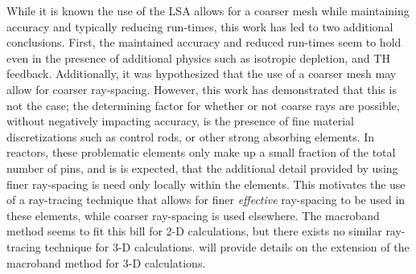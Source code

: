 {{    While it is known the use of the \ac{LSA} allows for a coarser mesh while maintaining accuracy and typically reducing run-times, this work has led to two additional conclusions.
    First, the maintained accuracy and reduced run-times seem to hold even in the presence of additional physics such as isotropic depletion, and \ac{TH} feedback.
    Additionally, it was hypothesized that the use of a coarser mesh may allow for coarser ray-spacing.
    However, this work has demonstrated that this is not the case; the determining factor for whether or not coarse rays are possible, without negatively impacting accuracy, is the presence of fine material discretizations such as control rods, or other strong absorbing elements.
    In reactors, these problematic elements only make up a small fraction of the total number of pins, and is is expected, that the additional detail provided by using finer ray-spacing is need only locally within the elements.
    This motivates the use of a ray-tracing technique that allows for finer \emph{effective} ray-spacing to be used in these elements, while coarser ray-spacing is used elsewhere.
    The macroband method seems to fit this bill for 2-D calculations, but there exists no similar ray-tracing technique for 3-D calculations.
     will provide details on the extension of the macroband method for 3-D calculations.
  }

  \printbibliography
}